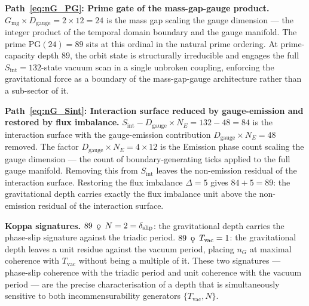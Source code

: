 \documentclass[11pt, letterpaper]{article}
\newcommand{\koppa}{\mathbin{\text{\rm\k{o}}}}
\theoremstyle{definition}
\theoremstyle{plain}
\begin{document}
\begin{rsbox}
\textbf{Path~\eqref{eq:nG_PG}: Prime gate of the mass-gap-gauge product.}
$G_\mathrm{mg} \times D_\mathrm{gauge} = 2 \times 12 = 24$ is the mass gap scaling
the gauge dimension — the integer product of the temporal domain boundary and the
gauge manifold. The prime $\mathrm{PG}(24) = 89$ sits at this ordinal in the natural
prime ordering. At prime-capacity depth $89$, the orbit state is structurally
irreducible and engages the full $S_\mathrm{int} = 132$-state vacuum scan in a single
unbroken coupling, enforcing the gravitational force as a boundary of the
mass-gap-gauge architecture rather than a sub-sector of it.

\textbf{Path~\eqref{eq:nG_Sint}: Interaction surface reduced by gauge-emission and
restored by flux imbalance.}
$S_\mathrm{int} - D_\mathrm{gauge} \times N_E = 132 - 48 = 84$ is the interaction
surface with the gauge-emission contribution $D_\mathrm{gauge} \times N_E = 48$
removed. The factor $D_\mathrm{gauge} \times N_E = 4 \times 12$ is the Emission
phase count scaling the gauge dimension — the count of boundary-generating ticks
applied to the full gauge manifold. Removing this from $S_\mathrm{int}$ leaves the
non-emission residual of the interaction surface. Restoring the flux imbalance
$\Delta = 5$ gives $84 + 5 = 89$: the gravitational depth carries exactly the
flux imbalance unit above the non-emission residual of the interaction surface.

\textbf{Koppa signatures.}
$89 \;\mathbin{\koppa}\; N = 2 = \delta_\mathrm{slip}$: the gravitational depth carries
the phase-slip signature against the triadic period.
$89 \;\mathbin{\koppa}\; T_\mathrm{vac} = 1$: the gravitational depth leaves a unit
residue against the vacuum period, placing $n_G$ at maximal coherence with $T_\mathrm{vac}$
without being a multiple of it. These two signatures — phase-slip coherence with the
triadic period and unit coherence with the vacuum period — are the precise characterisation
of a depth that is simultaneously sensitive to both incommensurability generators
$\{T_\mathrm{vac}, N\}$.
\end{rsbox}
\end{document}
